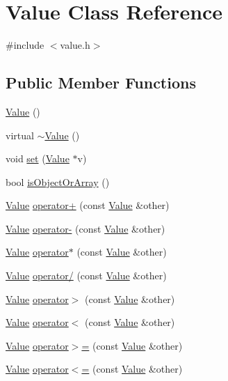\hypertarget{classValue}{}\section{Value Class Reference}
\label{classValue}


{\ttfamily \#include $<$value.\+h$>$}

\subsection*{Public Member Functions}
\begin{DoxyCompactItemize}
\item 
\hyperlink{classValue_abc2a5a2e6484fac66dae2539cc955667}{Value} ()
\item 
virtual \hyperlink{classValue_aceb26b90be781020c0c71ae5d16ca06f}{$\sim$\+Value} ()
\item 
void \hyperlink{classValue_a83944ac4d53d5bd27fd6a0bd2bc1bd3a}{set} (\hyperlink{classValue}{Value} $\ast$v)
\item 
bool \hyperlink{classValue_a37e1fe6c86dc755a3e000442c4949ab7}{is\+Object\+Or\+Array} ()
\item 
\hyperlink{classValue}{Value} \hyperlink{classValue_a59e467d3ee4cdfb802a2aed8a5a0f1dd}{operator+} (const \hyperlink{classValue}{Value} \&other)
\item 
\hyperlink{classValue}{Value} \hyperlink{classValue_aeb5e368aaea65ed1d1ef37fef6de80fc}{operator-\/} (const \hyperlink{classValue}{Value} \&other)
\item 
\hyperlink{classValue}{Value} \hyperlink{classValue_a8c1b2b5806fbf5d37d0b8bb2ec1ac584}{operator$\ast$} (const \hyperlink{classValue}{Value} \&other)
\item 
\hyperlink{classValue}{Value} \hyperlink{classValue_a5bee3270435124beed9a24cb78941a56}{operator/} (const \hyperlink{classValue}{Value} \&other)
\item 
\hyperlink{classValue}{Value} \hyperlink{classValue_a05800a20d5b799d1a81b28c950899aea}{operator$>$} (const \hyperlink{classValue}{Value} \&other)
\item 
\hyperlink{classValue}{Value} \hyperlink{classValue_ab8f33387ddbc00335cb96643e61643f6}{operator$<$} (const \hyperlink{classValue}{Value} \&other)
\item 
\hyperlink{classValue}{Value} \hyperlink{classValue_a85a296609b51245c4aec34ebf206a66d}{operator$>$=} (const \hyperlink{classValue}{Value} \&other)
\item 
\hyperlink{classValue}{Value} \hyperlink{classValue_a38e0f17676ad08e88bedffb1e931d543}{operator$<$=} (const \hyperlink{classValue}{Value} \&other)

\end{DoxyCompactItemize}
